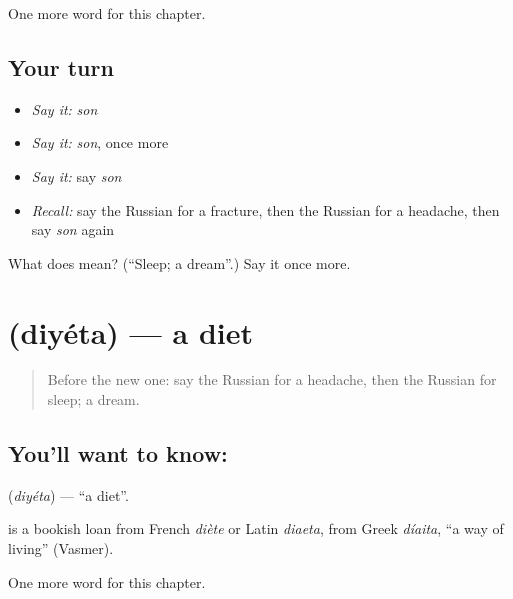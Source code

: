 \begin{grammarlens}[title={What you've built}]
One more word for this chapter.
\end{grammarlens}

\subsection*{Your turn}
\begin{itemize}
\raggedright
  \item \emph{Say it:} \emph{son}
  \item \emph{Say it:} \emph{son}, once more
  \item \emph{Say it:} say \emph{son}
  \item \emph{Recall:} say the Russian for a fracture, then the Russian for a headache, then say \emph{son} again
\end{itemize}

\begin{tcolorbox}[breakable,colback=teal!4,colframe=teal!35!black,title={Before you move on}]
What does  mean? (\textquotedblleft{}Sleep; a dream\textquotedblright{}.) Say it once more.
\end{tcolorbox}
\section[\texorpdfstring{\ru{диета} (diyéta)}{диета (diyéta)}]{ (diyéta) — a diet}

\label{lesson:RU-C180-diyeta}



\begin{quote}
Before the new one: say the Russian for a headache, then the Russian for sleep; a dream.
\end{quote}

\subsection*{You'll want to know: }
\textbf{} (\emph{diyéta}) — \textquotedblleft{}a diet\textquotedblright{}.

\begin{cousinweb}
\textbf{} is a bookish loan from French \emph{diète} or Latin \emph{diaeta}, from Greek \emph{díaita}, \textquotedblleft{}a way of living\textquotedblright{} (Vasmer).
\end{cousinweb}

\begin{grammarlens}[title={What you've built}]
One more word for this chapter.
\end{grammarlens}

